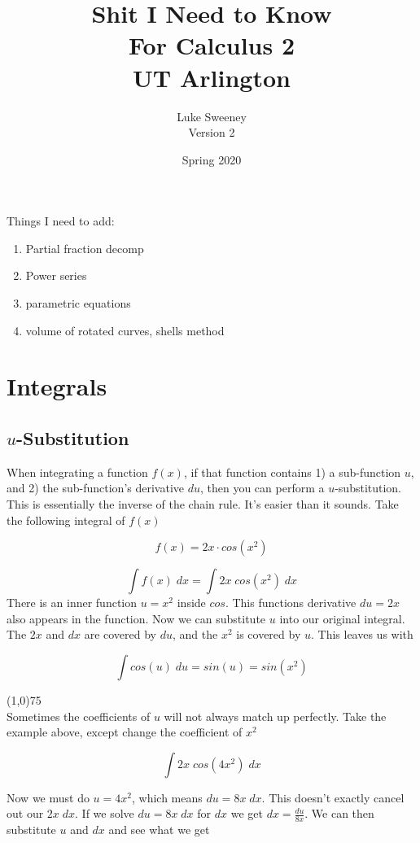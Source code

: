 \documentclass[12pt]{report}
\author{Luke Sweeney \\ \large Version 2}
\title{\textbf{Shit I Need to Know} \\ For Calculus 2 \\ UT Arlington}
\date{Spring 2020}
\begin{document}
\maketitle
\tableofcontents



Things I need to add:
\begin{enumerate}
	\item Partial fraction decomp
	\item Power series
	\item parametric equations
	\item volume of rotated curves, shells method
\end{enumerate}


\chapter{Integrals}


\section{$u$-Substitution}
When integrating a function $ f(x) $, if that function contains 1) a sub-function $ u $, and 2) the sub-function's derivative $ du $, then you can perform a $u$-substitution. This is essentially the inverse of the chain rule. It's easier than it sounds. Take the following integral of $ f(x) $

$$ f(x) = 2x \cdot cos(x^2) $$

$$
	\int f(x) \; dx = \int 2x \; cos(x^2) \; dx
$$
There is an inner function $ u = x^2 $ inside $ cos $. This functions derivative $ du = 2x $ also appears in the function. Now we can substitute $u$ into our original integral. The $ 2x $ and $ dx $ are covered by $ du $, and the $ x^2 $ is covered by $ u $. This leaves us with

$$ \int cos(u) \; du = sin(u) = sin(x^2)  $$

\line(1,0){75} \\

Sometimes the coefficients of $u$ will not always match up perfectly. Take the example above, except change the coefficient of $ x^2 $

$$ \int 2x \; cos(4x^2) \; dx $$

Now we must do $ u = 4x^2 $, which means $ du = 8x \; dx $. This doesn't exactly cancel out our $ 2x \; dx $. If we solve $ du = 8x \; dx $ for $ dx $ we get $ dx = \frac{du}{8x} $. We can then substitute $u$ and $dx$ and see what we get
\end{document}
